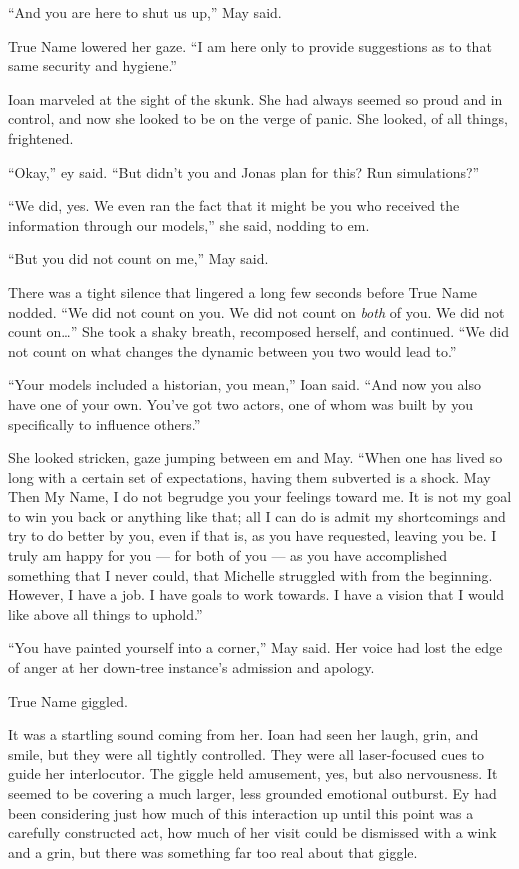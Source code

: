 ``And you are here to shut us up,'' May said.

True Name lowered her gaze. ``I am here only to provide suggestions as to that same security and hygiene.''

Ioan marveled at the sight of the skunk. She had always seemed so proud and in control, and now she looked to be on the verge of panic. She looked, of all things, frightened.

``Okay,'' ey said. ``But didn't you and Jonas plan for this? Run simulations?''

``We did, yes. We even ran the fact that it might be you who received the information through our models,'' she said, nodding to em.

``But you did not count on me,'' May said.

There was a tight silence that lingered a long few seconds before True Name nodded. ``We did not count on you. We did not count on \emph{both} of you. We did not count on\ldots{}'' She took a shaky breath, recomposed herself, and continued. ``We did not count on what changes the dynamic between you two would lead to.''

``Your models included a historian, you mean,'' Ioan said. ``And now you also have one of your own. You've got two actors, one of whom was built by you specifically to influence others.''

She looked stricken, gaze jumping between em and May. ``When one has lived so long with a certain set of expectations, having them subverted is a shock. May Then My Name, I do not begrudge you your feelings toward me. It is not my goal to win you back or anything like that; all I can do is admit my shortcomings and try to do better by you, even if that is, as you have requested, leaving you be. I truly am happy for you — for both of you — as you have accomplished something that I never could, that Michelle struggled with from the beginning. However, I have a job. I have goals to work towards. I have a vision that I would like above all things to uphold.''

``You have painted yourself into a corner,'' May said. Her voice had lost the edge of anger at her down-tree instance's admission and apology.

True Name giggled.

It was a startling sound coming from her. Ioan had seen her laugh, grin, and smile, but they were all tightly controlled. They were all laser-focused cues to guide her interlocutor. The giggle held amusement, yes, but also nervousness. It seemed to be covering a much larger, less grounded emotional outburst. Ey had been considering just how much of this interaction up until this point was a carefully constructed act, how much of her visit could be dismissed with a wink and a grin, but there was something far too real about that giggle.

